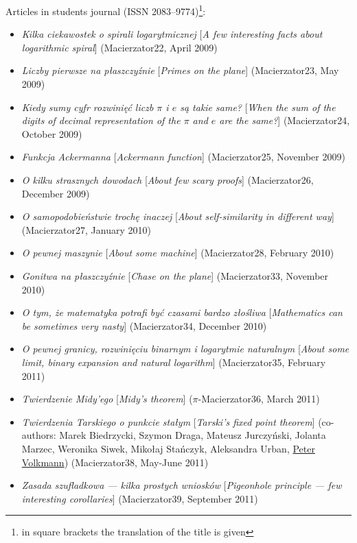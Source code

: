 \noindent Articles in students journal \macierzator{} (ISSN 2083--9774)\footnote{in square brackets the translation of the title is given}:
\begin{itemize}
  \item \textsl{Kilka ciekawostek o spirali logarytmicznej} [\textsl{A few interesting facts about logarithmic spiral}] (Macierzator22, April 2009)
  \item \textsl{Liczby pierwsze na płaszczyźnie} [\textsl{Primes on the plane}] (Macierzator23, May 2009)
  \item \textsl{Kiedy sumy cyfr rozwinięć liczb $\pi$ i $e$ są takie same?} [\textsl{When the sum of the digits of decimal representation of the $\pi$ and $e$ are the same?}] (Macierzator24, October 2009)
  \item \textsl{Funkcja Ackermanna} [\textsl{Ackermann function}] (Macierzator25, November 2009)
  \item \textsl{O kilku strasznych dowodach} [\textsl{About few scary proofs}] (Macierzator26, December 2009)
  \item \textsl{O samopodobieństwie  trochę inaczej} [\textsl{About self-similarity in different way}] (Macierzator27, January 2010)
  \item \textsl{O pewnej maszynie} [\textsl{About some machine}] (Macierzator28, February 2010)
  \item \textsl{Gonitwa na płaszczyźnie} [\textsl{Chase on the plane}] (Macierzator33, November 2010)
  \item \textsl{O tym, że matematyka potrafi być czasami bardzo złośliwa} [\textsl{Mathematics can be sometimes very nasty}] (Macierzator34, December 2010)
  \item \textsl{O pewnej granicy, rozwinięciu binarnym i logarytmie naturalnym} [\textsl{About some limit, binary expansion and natural logarithm}] (Macierzator35, February 2011)
  \item \textsl{Twierdzenie Midy'ego} [\textsl{Midy's theorem}] ($\pi$-Macierzator36, March 2011)
  \item \textsl{Twierdzenia Tarskiego o punkcie stałym} [\textsl{Tarski's fixed point theorem}] (co-authors: Marek Biedrzycki, Szymon Draga, Mateusz Jurczyński, Jolanta Marzec, Weronika Siwek, Mikołaj Stańczyk, Aleksandra Urban, \href{https://www.math.kit.edu/iana2/~volkmann/}{Peter Volkmann}) (Macierzator38, May-June 2011)
  \item \textsl{Zasada szufladkowa --- kilka prostych wniosków} [\textsl{Pigeonhole principle --- few interesting corollaries}] (Macierzator39, September 2011)

\end{itemize}
